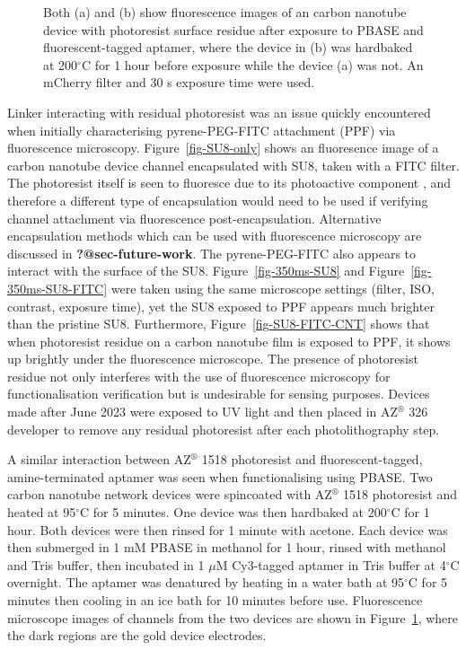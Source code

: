 \documentclass[
  a4paper,
]{scrbook}
\begin{document}
\begin{figure}
\begin{minipage}[t]{0.47\linewidth}
{{}

}

\subcaption{\label{fig-aptamer-photoresist-2}}
\end{minipage}%

\caption{\label{fig-aptamer-photoresist}Both (a) and (b) show
fluorescence images of an carbon nanotube device with photoresist
surface residue after exposure to PBASE and fluorescent-tagged aptamer,
where the device in (b) was hardbaked at 200\(^\circ\)C for 1 hour
before exposure while the device (a) was not. An mCherry filter and 30 s
exposure time were used.}

\end{figure}

Linker interacting with residual photoresist was an issue quickly
encountered when initially characterising pyrene-PEG-FITC attachment
(PPF) via fluorescence microscopy. Figure~\ref{fig-SU8-only} shows an
fluoresence image of a carbon nanotube device channel encapsulated with
SU8, taken with a FITC filter. The photoresist itself is seen to
fluoresce due to its photoactive component \autocite{Pai2007}, and
therefore a different type of encapsulation would need to be used if
verifying channel attachment via fluorescence post-encapsulation.
Alternative encapsulation methods which can be used with fluorescence
microscopy are discussed in \textbf{?@sec-future-work}. The
pyrene-PEG-FITC also appears to interact with the surface of the SU8.
Figure~\ref{fig-350ms-SU8} and Figure~\ref{fig-350ms-SU8-FITC} were
taken using the same microscope settings (filter, ISO, contrast,
exposure time), yet the SU8 exposed to PPF appears much brighter than
the pristine SU8. Furthermore, Figure~\ref{fig-SU8-FITC-CNT} shows that
when photoresist residue on a carbon nanotube film is exposed to PPF, it
shows up brightly under the fluorescence microscope. The presence of
photoresist residue not only interferes with the use of fluorescence
microscopy for functionalisation verification but is undesirable for
sensing purposes. Devices made after June 2023 were exposed to UV light
and then placed in AZ\(^\circledR\) 326 developer to remove any residual
photoresist after each photolithography step.

A similar interaction between AZ\(^\circledR\) 1518 photoresist and
fluorescent-tagged, amine-terminated aptamer was seen when
functionalising using PBASE. Two carbon nanotube network devices were
spincoated with AZ\(^\circledR\) 1518 photoresist and heated at
95\(^\circ\)C for 5 minutes. One device was then hardbaked at
200\(^\circ\)C for 1 hour. Both devices were then rinsed for 1 minute
with acetone. Each device was then submerged in 1 mM PBASE in methanol
for 1 hour, rinsed with methanol and Tris buffer, then incubated in 1
\(\mu\)M Cy3-tagged aptamer in Tris buffer at 4\(^\circ\)C overnight.
The aptamer was denatured by heating in a water bath at 95\(^\circ\)C
for 5 minutes then cooling in an ice bath for 10 minutes before use.
Fluorescence microscope images of channels from the two devices are
shown in Figure~\ref{fig-aptamer-photoresist}, where the dark regions
are the gold device electrodes.
\end{document}

